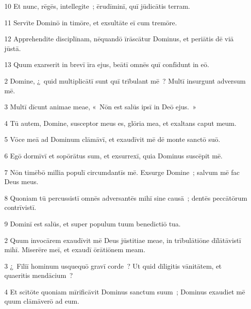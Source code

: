 \psalmVerse
  {\phantom{0}10}
  {Et nunc, rēgēs, intellegite~; ērudīminī, quī jūdicātis terram.}


\psalmVerse
  {\phantom{0}11}
  {Servīte Dominō in timōre, et exsultāte eī cum tremōre.}


\psalmVerse
  {\phantom{0}12}
  {Apprehendite disciplīnam, nēquandō īrāscātur Dominus, et periātis dē viā jūstā.}


\psalmVerse
  {\phantom{0}13}
  {Quum exarserit in brevī īra ejus, beātī omnēs quī confīdunt in eō.}



\psalmVerse
  {\phantom{00}2}
  {Domine, ¿~quid multiplicātī sunt quī trībulant mē~? Multī insurgunt adversum mē.}


\psalmVerse
  {\phantom{00}3}
  {Multī dīcunt animae meae, «~Nōn est salūs ipsī in Deō ejus.~»}


\psalmVerse
  {\phantom{00}4}
  {Tū autem, Domine, susceptor meus es, glōria mea, et exaltans caput meum.}


\psalmVerse
  {\phantom{00}5}
  {Vōce meā ad Dominum clāmāvī, et exaudīvit mē dē monte sanctō suō.}


\psalmVerse
  {\phantom{00}6}
  {Egō dormīvī et sopōrātus sum, et exsurrexī, quia Dominus suscēpit mē.}


\psalmVerse
  {\phantom{00}7}
  {Nōn timēbō millia populī circumdantīs mē. Exsurge Domine~; salvum mē fac Deus meus.}


\psalmVerse
  {\phantom{00}8}
  {Quoniam tū percussistī omnēs adversantēs mihī sine causā~; dentēs peccātōrum contrīvistī.}


\psalmVerse
  {\phantom{00}9}
  {Dominī est salūs, et super populum tuum benedictiō tua.}




\psalmVerse
  {\phantom{00}2}
  {Quum invocārem exaudīvit mē Deus jūstitiae meae, in trībulātiōne dīlātāvistī mihī. Miserēre meī, et exaudī ōrātiōnem meam.}


\psalmVerse
  {\phantom{00}3}
  {¿~Fīliī hominum usquequō gravī corde~? Ut quid dīligitis vānitātem, et quaeritis mendācium~?}


\psalmVerse
  {\phantom{00}4}
  {Et scītōte quoniam mīrificāvit Dominus sanctum suum~; Dominus exaudiet mē quum clāmāverō ad eum.}


